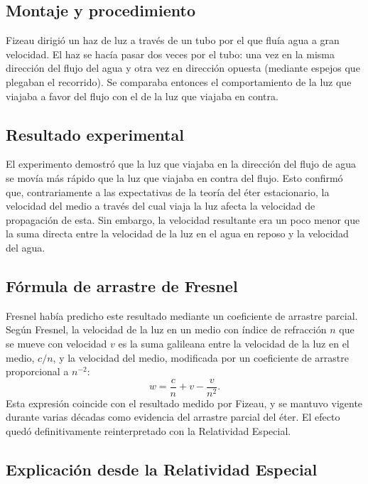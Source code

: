\subsection{Montaje y procedimiento}

Fizeau dirigió un haz de luz a través de un tubo por el que fluía agua a gran velocidad. El haz se hacía pasar dos veces por el tubo: una vez en la misma dirección del flujo del agua y otra vez en dirección opuesta (mediante espejos que plegaban el recorrido). Se comparaba entonces el comportamiento de la luz que viajaba a favor del flujo con el de la luz que viajaba en contra.

\subsection{Resultado experimental}

El experimento demostró que la luz que viajaba en la dirección del flujo de agua se movía más rápido que la luz que viajaba en contra del flujo. Esto confirmó que, contrariamente a las expectativas de la teoría del éter estacionario, la velocidad del medio a través del cual viaja la luz afecta la velocidad de propagación de esta. Sin embargo, la velocidad resultante era un poco menor que la suma directa entre la velocidad de la luz en el agua en reposo y la velocidad del agua.

\subsection{Fórmula de arrastre de Fresnel}

Fresnel había predicho este resultado mediante un coeficiente de arrastre parcial. Según Fresnel, la velocidad de la luz en un medio con índice de refracción $n$ que se mueve con velocidad $v$ es la suma galileana entre la velocidad de la luz en el medio, $c/n$, y la velocidad del medio, modificada por un coeficiente de arrastre proporcional a $n^{-2}$:
$$
w=\frac{c}{n}+v-\frac{v}{n^{2}}.
$$
Esta expresión coincide con el resultado medido por Fizeau, y se mantuvo vigente durante varias décadas como evidencia del arrastre parcial del éter. El efecto quedó definitivamente reinterpretado con la Relatividad Especial.

\subsection{Explicación desde la Relatividad Especial}

